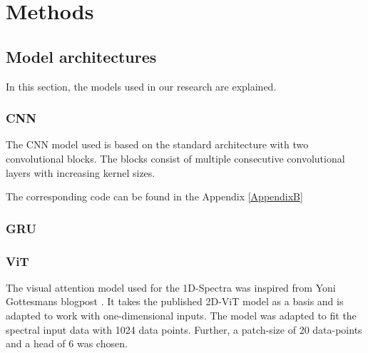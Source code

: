 


\chapter{Methods} %

\label{Chapter3} %







\section{Model architectures}
In this section, the models used in our research are explained.

\subsection{CNN}
The CNN model used is based on the standard architecture with two convolutional blocks. The blocks consist of multiple consecutive convolutional layers with increasing kernel sizes.


The corresponding code can be found in the Appendix \ref{AppendixB}

\subsection{GRU}


\subsection{ViT}
The visual attention model used for the 1D-Spectra was inspired from Yoni Gottesmans blogpost \cite{noauthor_interpretable_2023}. It takes the published 2D-ViT model  as a basis and is adapted to work with one-dimensional inputs.
The model was adapted to fit the spectral input data with 1024 data points. Further, a patch-size of 20 data-points and a head of 6 was chosen.

